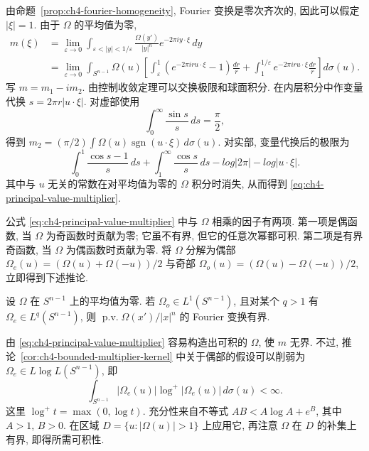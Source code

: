 \begin{Proof}
由命题~\ref{prop:ch4-fourier-homogeneity}, Fourier 变换是零次齐次的, 因此可以假定 $|\xi|=1$. 由于 $\Omega$ 的平均值为零,
\[
\begin{aligned}
 m(\xi)
 &=\lim_{\varepsilon\to0}\int_{\varepsilon<|y|<1/\varepsilon}
 \frac{\Omega(y')}{|y|^n}e^{-2\pi iy\cdot\xi}\,dy\\
 &=\lim_{\varepsilon\to0}\int_{S^{n-1}}\Omega(u)
 \left[\int_\varepsilon^1(e^{-2\pi iru\cdot\xi}-1)\frac{dr}{r}
 +\int_1^{1/\varepsilon}e^{-2\pi iru\cdot\xi}\frac{dr}{r}\right]d\sigma(u).
\end{aligned}
\]
写 $m=m_1-im_2$. 由控制收敛定理可以交换极限和球面积分. 在内层积分中作变量代换 $s=2\pi r|u\cdot\xi|$. 对虚部使用
\[
 \int_0^\infty\frac{\sin s}{s}\,ds=\frac\pi2,
\]
得到 $m_2=(\pi/2)\int\Omega(u)\operatorname{sgn}(u\cdot\xi)\,d\sigma(u)$. 对实部, 变量代换后的极限为
\[
 \int_0^1\frac{\cos s-1}{s}\,ds+
 \int_1^\infty\frac{\cos s}{s}\,ds-log|2\pi|-log|u\cdot\xi|.
\]
其中与 $u$ 无关的常数在对平均值为零的 $\Omega$ 积分时消失, 从而得到 \eqref{eq:ch4-principal-value-multiplier}.
\end{Proof}

\hypertarget{chapter-04-page-085}{}
公式 \eqref{eq:ch4-principal-value-multiplier} 中与 $\Omega$ 相乘的因子有两项. 第一项是偶函数, 当 $\Omega$ 为奇函数时贡献为零; 它虽不有界, 但它的任意次幂都可积. 第二项是有界奇函数, 当 $\Omega$ 为偶函数时贡献为零. 将 $\Omega$ 分解为偶部 $\Omega_e(u)=(\Omega(u)+\Omega(-u))/2$ 与奇部 $\Omega_o(u)=(\Omega(u)-\Omega(-u))/2$, 立即得到下述推论.

\begin{Corollary}
\label{cor:ch4-bounded-multiplier-kernel}
设 $\Omega$ 在 $S^{n-1}$ 上的平均值为零. 若 $\Omega_o\in L^1(S^{n-1})$, 且对某个 $q>1$ 有 $\Omega_e\in L^q(S^{n-1})$, 则 $\operatorname{p.v.}\Omega(x')/|x|^n$ 的 Fourier 变换有界.
\end{Corollary}

由 \eqref{eq:ch4-principal-value-multiplier} 容易构造出可积的 $\Omega$, 使 $m$ 无界. 不过, 推论~\ref{cor:ch4-bounded-multiplier-kernel} 中关于偶部的假设可以削弱为 $\Omega_e\in L\log L(S^{n-1})$, 即
\[
 \int_{S^{n-1}}|\Omega_e(u)|\log^+|\Omega_e(u)|\,d\sigma(u)<\infty.
\]
这里 $\log^+t=\max(0,\log t)$. 充分性来自不等式 $AB<A\log A+e^B$, 其中 $A>1$, $B>0$. 在区域 $D=\{u:|\Omega(u)|>1\}$ 上应用它, 再注意 $\Omega$ 在 $D$ 的补集上有界, 即得所需可积性.
